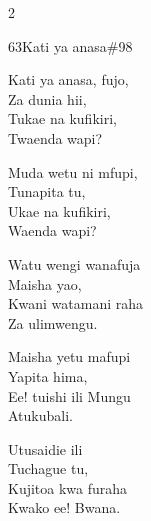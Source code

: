 \begin{multicols}{2}
\begin{hymn}{63}{Kati ya anasa}{\#98}
\begin{stanza}
Kati ya anasa, fujo,\\
Za dunia hii,\\
Tukae na kufikiri,\\
Twaenda wapi?
\end{stanza}
\begin{chorus}
Muda wetu ni mfupi,\\
Tunapita tu,\\
Ukae na kufikiri,\\
Waenda wapi?
\end{chorus}
\begin{stanza}
Watu wengi wanafuja\\
Maisha yao,\\
Kwani watamani raha\\
Za ulimwengu.
\end{stanza}
\begin{stanza}
Maisha yetu mafupi\\
Yapita hima,\\
Ee! tuishi ili Mungu\\
Atukubali.
\end{stanza}
\begin{stanza}
Utusaidie ili\\
Tuchague tu,\\
Kujitoa kwa furaha\\
Kwako ee! Bwana.
\end{stanza}
\end{hymn}


\end{multicols}
